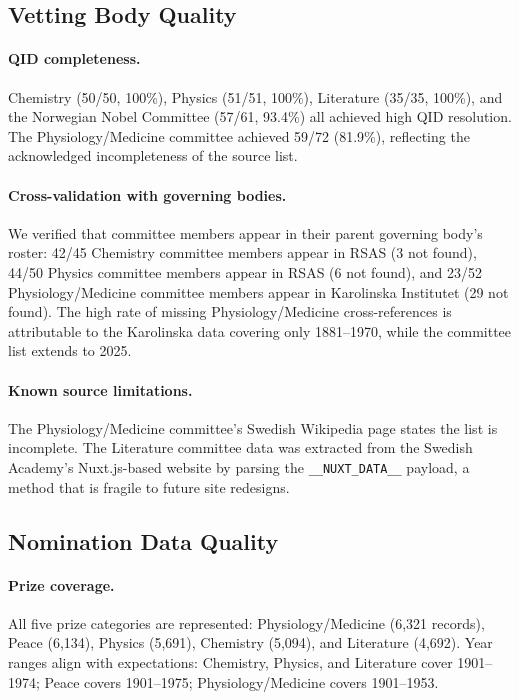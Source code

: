 \subsection{Vetting Body Quality}

\paragraph{QID completeness.} Chemistry (50/50, 100\%), Physics (51/51,
100\%), Literature (35/35, 100\%), and the Norwegian Nobel Committee
(57/61, 93.4\%) all achieved high QID resolution. The Physiology/Medicine
committee achieved 59/72 (81.9\%), reflecting the acknowledged
incompleteness of the source list.

\paragraph{Cross-validation with governing bodies.} We verified that
committee members appear in their parent governing body's roster: 42/45
Chemistry committee members appear in RSAS (3 not found), 44/50 Physics
committee members appear in RSAS (6 not found), and 23/52
Physiology/Medicine committee members appear in Karolinska Institutet
(29 not found). The high rate of missing Physiology/Medicine cross-references
is attributable to the Karolinska data covering only 1881--1970, while the
committee list extends to 2025.

\paragraph{Known source limitations.} The Physiology/Medicine committee's
Swedish Wikipedia page states the list is incomplete. The Literature
committee data was extracted from the Swedish Academy's Nuxt.js-based
website by parsing the \texttt{\_\_NUXT\_DATA\_\_} payload, a method that
is fragile to future site redesigns.

\subsection{Nomination Data Quality}

\paragraph{Prize coverage.} All five prize categories are represented:
Physiology/Medicine (6{,}321 records), Peace (6{,}134), Physics (5{,}691),
Chemistry (5{,}094), and Literature (4{,}692). Year ranges align with
expectations: Chemistry, Physics, and Literature cover 1901--1974; Peace
covers 1901--1975; Physiology/Medicine covers 1901--1953.

